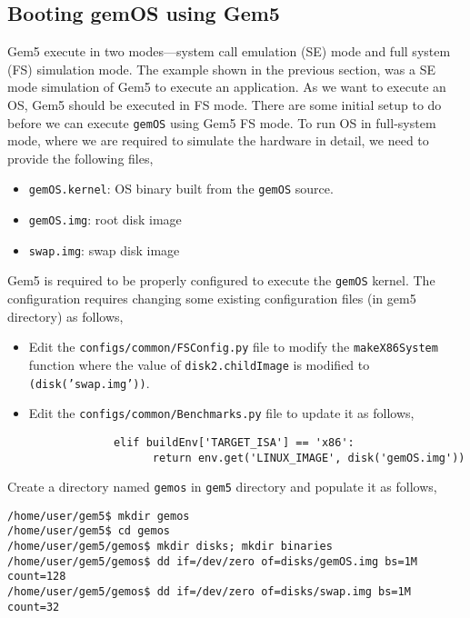 \documentclass[12pt]{article}
\begin{document}
\subsection{Booting gemOS using Gem5} 
Gem5 execute in two modes---system call emulation (SE) mode and full system (FS) simulation mode.
%
The example shown in the previous section, was a SE mode simulation of Gem5 to execute an application.
%
As we want to execute an OS, Gem5 should be executed in FS mode. 
%
There are some initial setup to do before we can execute \texttt{gemOS} using Gem5 FS mode.
%
To run OS in full-system mode, where we are required to simulate the hardware in detail, 
we need to provide the following files,
\begin{itemize}
    \item \texttt{gemOS.kernel}: OS binary built from the \texttt{gemOS} source. 
    \item \texttt{gemOS.img}: root disk image
    \item \texttt{swap.img}: swap disk image
\end{itemize}

Gem5 is required to be properly configured to execute the \texttt{gemOS} kernel. 
The configuration requires changing
some existing configuration files (in gem5 directory) as follows,
\begin{itemize}
   \item Edit the \texttt{configs/common/FSConfig.py} file to modify the \texttt{makeX86System} function
         where the value of \texttt{disk2.childImage} is modified to \texttt{(disk('swap.img'))}.
   \item Edit the \texttt{configs/common/Benchmarks.py} file to update it as follows, 
         \begin{verbatim}
             elif buildEnv['TARGET_ISA'] == 'x86':
                   return env.get('LINUX_IMAGE', disk('gemOS.img'))
         \end{verbatim}
\end{itemize}
\noindent
Create a directory named \texttt{gemos} in \texttt{gem5} directory and populate it as follows,

\vspace{0.25cm}
\noindent
\texttt{/home/user/gem5\$ mkdir gemos} \\
\texttt{/home/user/gem5\$ cd gemos} \\
\texttt{/home/user/gem5/gemos\$ mkdir disks; mkdir binaries} \\
\texttt{/home/user/gem5/gemos\$ dd if=/dev/zero of=disks/gemOS.img bs=1M count=128} \\
\texttt{/home/user/gem5/gemos\$ dd if=/dev/zero of=disks/swap.img bs=1M count=32} \\
\end{document}
